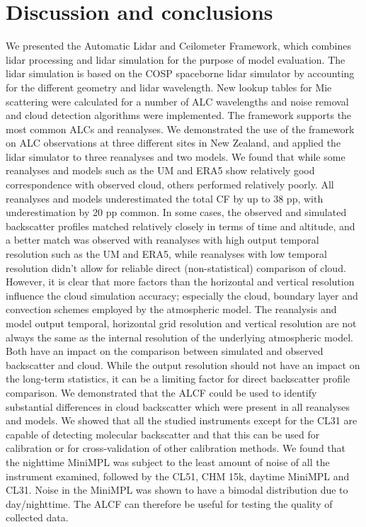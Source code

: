 \section{Discussion and conclusions}
\label{sec:conclusions}

We presented the Automatic Lidar and
Ceilometer Framework, which combines lidar processing and lidar simulation
for the purpose of model evaluation. The lidar simulation is based on
the COSP spaceborne lidar simulator by accounting for the different geometry
and lidar wavelength. New lookup tables for Mie scattering were calculated
for a number of ALC wavelengths and noise removal and cloud detection algorithms
were implemented. The framework supports the most common ALCs and reanalyses.
We demonstrated the use of the framework
on ALC observations at three different sites in New Zealand,
and applied the lidar simulator to three reanalyses and two models. We found that while
some reanalyses and models such as the UM and ERA5 show relatively good correspondence with observed
cloud, others performed relatively poorly. All reanalyses and models
underestimated the total CF by up to 38 pp, with underestimation by 20 pp
common. In some cases, the observed and simulated backscatter profiles matched
relatively closely in terms of time and altitude, and a better match was observed
with reanalyses with high output temporal resolution such as the UM and ERA5,
while reanalyses with low temporal resolution didn't allow for reliable direct (non-statistical) comparison of cloud.
However, it is clear that more factors than the horizontal and vertical
resolution influence the cloud simulation
accuracy; especially the cloud, boundary layer and convection schemes employed
by the atmospheric model.
The reanalysis and model output temporal, horizontal grid resolution
and vertical resolution are not always the same as the internal resolution of
the underlying atmospheric model. Both have an impact on the comparison
between simulated and observed backscatter and cloud.
While the output resolution should not have an impact on the long-term
statistics, it can be a limiting factor for direct backscatter profile comparison.
We demonstrated that the ALCF could be used to identify substantial
differences in cloud backscatter which were present in all reanalyses and models.
We showed that all the studied instruments except for the CL31 are capable of
detecting molecular backscatter and that this can be used for calibration or for cross-validation of other calibration methods.
We found that the nighttime MiniMPL was subject to the least amount of noise of all the instrument examined, followed
by the CL51, CHM 15k, daytime MiniMPL and CL31. Noise in the MiniMPL was shown to have a bimodal distribution due to day/nighttime.
The ALCF can therefore be useful for testing the quality of collected data.

